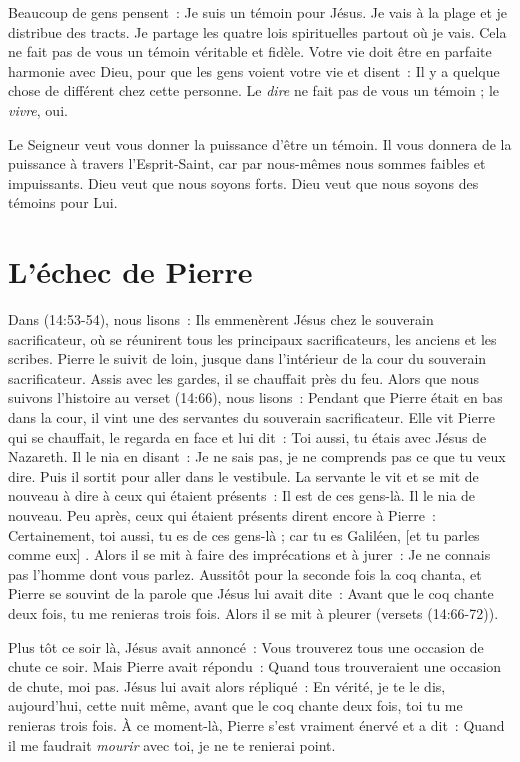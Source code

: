 Beaucoup de gens pensent~:
 \og Je suis un témoin pour Jésus. Je vais à la plage
 et je distribue des tracts. Je partage les quatre lois spirituelles
 partout où je vais. \fg{}
 Cela ne fait pas de vous un témoin véritable et fidèle.
 Votre vie doit être en parfaite harmonie avec Dieu,
 pour que les gens voient votre vie et disent~:
 \og Il y a quelque chose de différent chez cette personne. \fg{}
 Le \emph{dire} ne fait pas de vous un témoin ; le \emph{vivre}, oui.

Le Seigneur veut vous donner la puissance d'être un témoin.
 Il vous donnera de la puissance à travers l'Esprit-Saint,
 car par nous-mêmes nous sommes faibles et impuissants.
 Dieu veut que nous soyons forts.
 Dieu veut que nous soyons des témoins pour Lui.

\section*{L'échec de Pierre}

Dans (14:53-54), nous lisons~:
 \og Ils emmenèrent Jésus chez le souverain sacrificateur,
 où se réunirent tous les principaux sacrificateurs,
 les anciens et les scribes.
 Pierre le suivit de loin, jusque dans l'intérieur de la cour
 du souverain sacrificateur.
 Assis avec les gardes, il se chauffait près du feu. \fg{}
 Alors que nous suivons l'histoire au verset (14:66),
 nous lisons~:
 \og Pendant que Pierre était en bas dans la cour,
 il vint une des servantes du souverain sacrificateur.
 Elle vit Pierre qui se chauffait, le regarda en face et lui dit~:
 Toi aussi, tu étais avec Jésus de Nazareth. Il le nia en disant~:
 Je ne sais pas, je ne comprends pas ce que tu veux dire.
 Puis il sortit pour aller dans le vestibule.
 La servante le vit et se mit de nouveau à dire
 à ceux qui étaient présents~: Il est de ces gens-là.
 Il le nia de nouveau. Peu après, ceux qui étaient présents
 dirent encore à Pierre~: Certainement, toi aussi,
 tu es de ces gens-là ; car tu es Galiléen, [et tu parles comme eux] .
 Alors il se mit à faire des imprécations et à jurer~:
 Je ne connais pas l'homme dont vous parlez. Aussitôt pour la seconde fois
 la coq chanta, et Pierre se souvint de la parole que Jésus lui avait dite~:
 Avant que le coq chante deux fois, tu me renieras trois fois.
 Alors il se mit à pleurer \fg{} (versets (14:66-72)).

Plus tôt ce soir là, Jésus avait annoncé~:
 \og Vous trouverez tous une occasion de chute ce soir. \fg{}
 Mais Pierre avait répondu~:
 \og Quand tous trouveraient une occasion de chute, moi pas. \fg{}
 Jésus lui avait alors répliqué~:
 \og En vérité, je te le dis, aujourd'hui, cette nuit même,
 avant que le coq chante deux fois, toi tu me renieras trois fois. \fg{}
 À ce moment-là, Pierre s'est vraiment énervé et a dit~:
 \og Quand il me faudrait \emph{mourir} avec toi, je ne te renierai point. \fg{}

